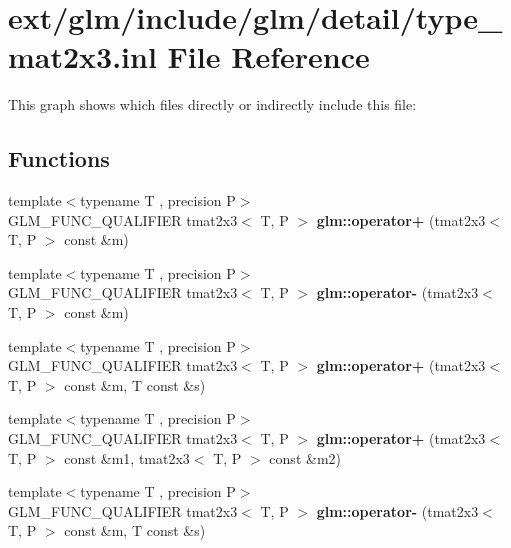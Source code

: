 \hypertarget{type__mat2x3_8inl}{\section{ext/glm/include/glm/detail/type\-\_\-mat2x3.inl File Reference}
\label{type__mat2x3_8inl}
}
This graph shows which files directly or indirectly include this file\-:
\subsection*{Functions}
\begin{DoxyCompactItemize}
\item 
\hypertarget{namespaceglm_adbd6031dd5be1df1ba21e09770d80baa}{{\footnotesize template$<$typename T , precision P$>$ }\\G\-L\-M\-\_\-\-F\-U\-N\-C\-\_\-\-Q\-U\-A\-L\-I\-F\-I\-E\-R tmat2x3$<$ T, P $>$ {\bfseries glm\-::operator+} (tmat2x3$<$ T, P $>$ const \&m)}\label{namespaceglm_adbd6031dd5be1df1ba21e09770d80baa}

\item 
\hypertarget{namespaceglm_ac0531b9437e7358ffddc22b5391ddcca}{{\footnotesize template$<$typename T , precision P$>$ }\\G\-L\-M\-\_\-\-F\-U\-N\-C\-\_\-\-Q\-U\-A\-L\-I\-F\-I\-E\-R tmat2x3$<$ T, P $>$ {\bfseries glm\-::operator-\/} (tmat2x3$<$ T, P $>$ const \&m)}\label{namespaceglm_ac0531b9437e7358ffddc22b5391ddcca}

\item 
\hypertarget{namespaceglm_a1c2757b8d487ce43f1e968d2258a9ea2}{{\footnotesize template$<$typename T , precision P$>$ }\\G\-L\-M\-\_\-\-F\-U\-N\-C\-\_\-\-Q\-U\-A\-L\-I\-F\-I\-E\-R tmat2x3$<$ T, P $>$ {\bfseries glm\-::operator+} (tmat2x3$<$ T, P $>$ const \&m, T const \&s)}\label{namespaceglm_a1c2757b8d487ce43f1e968d2258a9ea2}

\item 
\hypertarget{namespaceglm_a7578fa8147ab1357184c6043278f38e5}{{\footnotesize template$<$typename T , precision P$>$ }\\G\-L\-M\-\_\-\-F\-U\-N\-C\-\_\-\-Q\-U\-A\-L\-I\-F\-I\-E\-R tmat2x3$<$ T, P $>$ {\bfseries glm\-::operator+} (tmat2x3$<$ T, P $>$ const \&m1, tmat2x3$<$ T, P $>$ const \&m2)}\label{namespaceglm_a7578fa8147ab1357184c6043278f38e5}

\item 
\hypertarget{namespaceglm_aceff894a5f891e315294d68c9bb6f569}{{\footnotesize template$<$typename T , precision P$>$ }\\G\-L\-M\-\_\-\-F\-U\-N\-C\-\_\-\-Q\-U\-A\-L\-I\-F\-I\-E\-R tmat2x3$<$ T, P $>$ {\bfseries glm\-::operator-\/} (tmat2x3$<$ T, P $>$ const \&m, T const \&s)}\label{namespaceglm_aceff894a5f891e315294d68c9bb6f569}


\end{DoxyCompactItemize}
